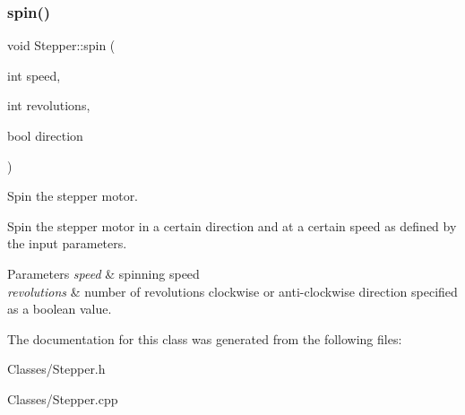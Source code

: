 \subsubsection{\texorpdfstring{spin()}{spin()}}
{\footnotesize\ttfamily void Stepper\+::spin (\begin{DoxyParamCaption}\item[{int}]{speed,  }\item[{int}]{revolutions,  }\item[{bool}]{direction }\end{DoxyParamCaption})}



Spin the stepper motor. 

Spin the stepper motor in a certain direction and at a certain speed as defined by the input parameters. 
\begin{DoxyParams}{Parameters}
{\em speed} & spinning speed \\
\hline
{\em revolutions} & number of revolutions  clockwise or anti-\/clockwise direction specified as a boolean value. \\
\hline
\end{DoxyParams}


The documentation for this class was generated from the following files\+:\begin{DoxyCompactItemize}
\item 
Classes/Stepper.\+h\item 
Classes/Stepper.\+cpp\end{DoxyCompactItemize}

